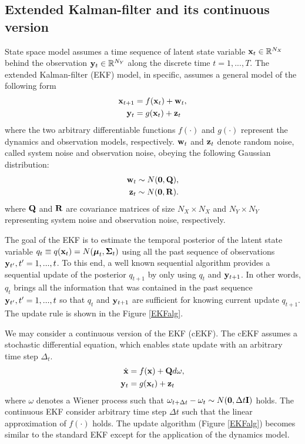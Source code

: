 \documentclass{article}
\begin{document}
\subsection{Extended Kalman-filter and its continuous version}
State space model assumes a time sequence of latent state variable ${\bf x}_t\in\mathbb{R}^{N_X}$
behind the observation ${\bf y}_t\in\mathbb{R}^{N_Y}$ along the discrete time $t=1,...,T$.
The extended Kalman-filter (EKF) model, in specific, assumes a general model of the following form
\begin{align}
 {\bf x}_{t+1} &= f( {\bf x}_t ) + {\bf w}_t, \\
 {\bf y}_{t} &= g( {\bf x}_t ) + {\bf z}_t
\end{align}
where the two arbitrary differentiable functions
$f(\cdot)$ and $g(\cdot)$ represent the dynamics and observation models, respectively.
${\bf w}_t$ and ${\bf z}_t$ denote random noise, called system noise and observation noise, obeying the following Gaussian distribution:
\begin{align}
 {\bf w}_{t} \sim N( {\bf 0}, {\bf Q} ), \\
 {\bf z}_{t} \sim N( {\bf 0}, {\bf R} ).
\end{align}
where ${\bf Q}$ and ${\bf R}$ are covariance matrices of size $N_X\times N_X$ and $N_Y\times N_Y$
representing system noise and observation noise, respectively. 

The goal of the EKF is to estimate the temporal posterior of the latent state variable
 $q_t \equiv q({\bf x}_t) = N({\boldsymbol{\mu}}_t, {\boldsymbol{\Sigma}}_t)$ 
 using all the past sequence of observations ${\bf y}_{t'}, t'=1,...,t$.
To this end, a well known sequential algorithm provides a sequential update of the posterior $q_{t+1}$ by only using $q_{t}$ and ${\bf y}_{t+1}$.
In other words, $q_{t}$ brings all the information that was contained in the
past sequence ${\bf y}_{t'}, t'=1,...,t$ so that $q_{t}$ and ${\bf y}_{t+1}$ are sufficient for knowing current update $q_{t+1}$.
The update rule is shown in the Figure \ref{EKFalg}.

We may consider a continuous version of the EKF (cEKF). 
The cEKF assumes a stochastic differential equation, which enables state update with an arbitrary time step $\Delta_t$.
\begin{align}
 \dot{{\bf x}}  &= f( {\bf x} ) + {\bf Q} d\omega, \\
 {\bf y}_{t} &= g( {\bf x}_t ) + {\bf z}_t
\end{align}
where $\omega$ denotes a Wiener process such that
$\omega_{t+\Delta t}-\omega_t \sim N({\bf 0},\Delta t{\bf I})$ holds.
The continuous EKF consider arbitrary time step $\Delta t$ such that
 the linear approximation of $f(\cdot)$ holds.
The update algorithm (Figure \ref{EKFalg})
becomes similar to the standard EKF except for the application of the dynamics model.
 
\end{document}
